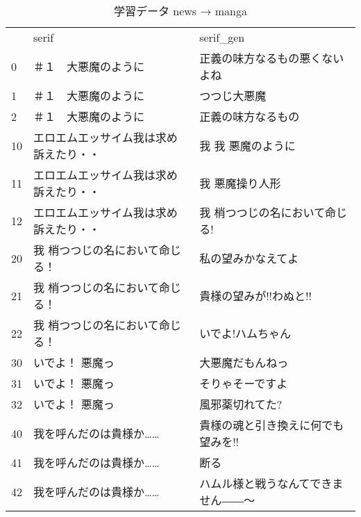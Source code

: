 \documentclass[onecolumn]{ujarticle}   %
\begin{document}
\begin{table}[tbh]
  \begin{center}
    \caption{学習データ news → manga}

    \begin{tabular}{lp{5cm}p{7cm}}
          & serif                                   & serif\_gen                                 \\
      0   & ＃１　大悪魔のように                              & 正義の味方なるもの悪くないよね                            \\
      1   & ＃１　大悪魔のように                              & つつじ大悪魔                                     \\
      2   & ＃１　大悪魔のように                              & 正義の味方なるもの                                  \\

      10  & エロエムエッサイム我は求め訴えたり・・                     & 我 我 悪魔のように                                 \\
      11  & エロエムエッサイム我は求め訴えたり・・                     & 我 悪魔操り人形                                   \\
      12  & エロエムエッサイム我は求め訴えたり・・                     & 我 梢つつじの名において命じる!                           \\

      20  & 我 梢つつじの名において命じる！                        & 私の望みかなえてよ                                  \\
      21  & 我 梢つつじの名において命じる！                        & 貴様の望みが!!わぬと!!                              \\
      22  & 我 梢つつじの名において命じる！                        & いでよ!ハムちゃん                                  \\

      30  & いでよ！ 悪魔っ                                & 大悪魔だもんねっ                                   \\
      31  & いでよ！ 悪魔っ                                & そりゃそーですよ                                   \\
      32  & いでよ！ 悪魔っ                                & 風邪薬切れてた?                                   \\

      40  & 我を呼んだのは貴様か……                            & 貴様の魂と引き換えに何でも望みを!!                         \\
      41  & 我を呼んだのは貴様か……                            & 断る                                         \\
      42  & 我を呼んだのは貴様か……                            & ハムル様と戦うなんてできません――～                         \\


\end{tabular}
\end{center}
\end{table}
\end{document}
